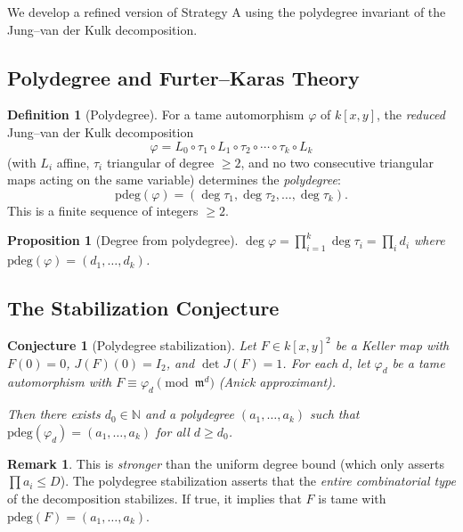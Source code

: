 \documentclass[12pt,a4paper]{article}
\newtheorem{proposition}[theorem]{Proposition}
\newtheorem{conjecture}[theorem]{Conjecture}
\theoremstyle{definition}
\newtheorem{definition}[theorem]{Definition}
\newtheorem{remark}[theorem]{Remark}
\newcommand{\NN}{\mathbb{N}}
\newcommand{\kk}{k}
\newcommand{\pp}{\mathfrak{m}}
\begin{document}
We develop a refined version of Strategy A using the polydegree invariant of the
Jung--van der Kulk decomposition.

\subsection{Polydegree and Furter--Karas Theory}

\begin{definition}[Polydegree]
For a tame automorphism $\varphi$ of $\kk[x,y]$, the \emph{reduced} Jung--van der Kulk
decomposition
\[
  \varphi = L_0 \circ \tau_1 \circ L_1 \circ \tau_2 \circ \cdots \circ \tau_k \circ L_k
\]
(with $L_i$ affine, $\tau_i$ triangular of degree $\geq 2$, and no two consecutive
triangular maps acting on the same variable) determines the \emph{polydegree}:
\[
  \mathrm{pdeg}(\varphi) = (\deg \tau_1, \deg \tau_2, \ldots, \deg \tau_k).
\]
This is a finite sequence of integers $\geq 2$.
\end{definition}

\begin{proposition}[Degree from polydegree]
$\deg \varphi = \prod_{i=1}^{k} \deg \tau_i = \prod_{i} d_i$ where
$\mathrm{pdeg}(\varphi) = (d_1, \ldots, d_k)$.
\end{proposition}

\subsection{The Stabilization Conjecture}

\begin{conjecture}[Polydegree stabilization]\label{conj:pdeg-stable}
Let $F \in \kk[x,y]^2$ be a Keller map with $F(0) = 0$, $J(F)(0) = I_2$, and
$\det J(F) = 1$. For each $d$, let $\varphi_d$ be a tame automorphism with
$F \equiv \varphi_d \pmod{\pp^d}$ (Anick approximant).

Then there exists $d_0 \in \NN$ and a polydegree $(a_1, \ldots, a_k)$ such that
$\mathrm{pdeg}(\varphi_d) = (a_1, \ldots, a_k)$ for all $d \geq d_0$.
\end{conjecture}

\begin{remark}
This is \emph{stronger} than the uniform degree bound (which only asserts
$\prod a_i \leq D$). The polydegree stabilization asserts that the \emph{entire
combinatorial type} of the decomposition stabilizes. If true, it implies that $F$ is
tame with $\mathrm{pdeg}(F) = (a_1, \ldots, a_k)$.
\end{remark}
\end{document}

